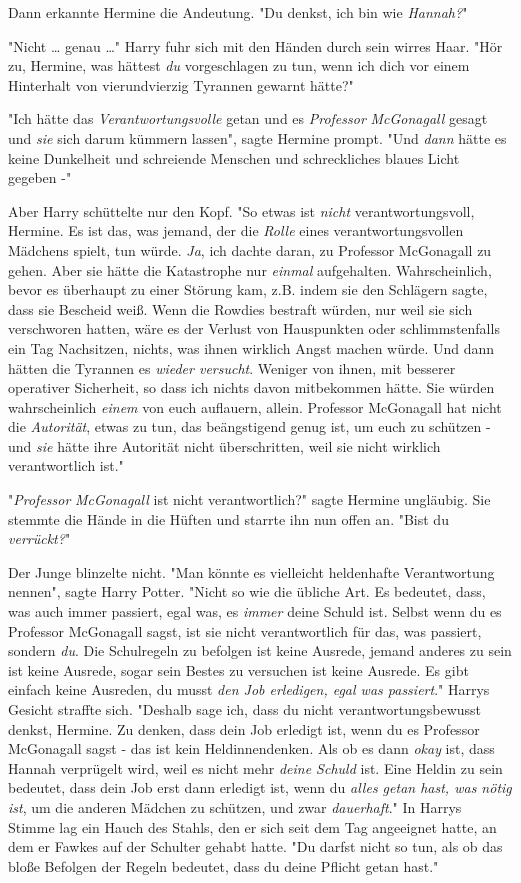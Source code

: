 {Dann erkannte Hermine die Andeutung. "Du denkst, ich bin wie \emph{Hannah?}"

"Nicht … genau …" Harry fuhr sich mit den Händen durch sein wirres Haar. "Hör zu, Hermine, was hättest \emph{du} vorgeschlagen zu tun, wenn ich dich vor einem Hinterhalt von vierundvierzig Tyrannen gewarnt hätte?"

"Ich hätte das \emph{Verantwortungsvolle} getan und es \emph{Professor} \emph{McGonagall} gesagt und \emph{sie} sich darum kümmern lassen", sagte Hermine prompt. "Und \emph{dann} hätte es keine Dunkelheit und schreiende Menschen und schreckliches blaues Licht gegeben -"

Aber Harry schüttelte nur den Kopf. "So etwas ist \emph{nicht} verantwortungsvoll, Hermine. Es ist das, was jemand, der die \emph{Rolle} eines verantwortungsvollen Mädchens spielt, tun würde. \emph{Ja}, ich dachte daran, zu Professor McGonagall zu gehen. Aber sie hätte die Katastrophe nur \emph{einmal} aufgehalten. Wahrscheinlich, bevor es überhaupt zu einer Störung kam, z.B. indem sie den Schlägern sagte, dass sie Bescheid weiß. Wenn die Rowdies bestraft würden, nur weil sie sich verschworen hatten, wäre es der Verlust von Hauspunkten oder schlimmstenfalls ein Tag Nachsitzen, nichts, was ihnen wirklich Angst machen würde. Und dann hätten die Tyrannen es \emph{wieder versucht}. Weniger von ihnen, mit besserer operativer Sicherheit, so dass ich nichts davon mitbekommen hätte. Sie würden wahrscheinlich \emph{einem} von euch auflauern, allein. Professor McGonagall hat nicht die \emph{Autorität}, etwas zu tun, das beängstigend genug ist, um euch zu schützen - und \emph{sie} hätte ihre Autorität nicht überschritten, weil sie nicht wirklich verantwortlich ist."

"\emph{Professor} \emph{McGonagall} ist nicht verantwortlich?" sagte Hermine ungläubig. Sie stemmte die Hände in die Hüften und starrte ihn nun offen an. "Bist du \emph{verrückt?}"

Der Junge blinzelte nicht. "Man könnte es vielleicht heldenhafte Verantwortung nennen", sagte Harry Potter. "Nicht so wie die übliche Art. Es bedeutet, dass, was auch immer passiert, egal was, es \emph{immer} deine Schuld ist. Selbst wenn du es Professor McGonagall sagst, ist sie nicht verantwortlich für das, was passiert, sondern \emph{du}. Die Schulregeln zu befolgen ist keine Ausrede, jemand anderes zu sein ist keine Ausrede, sogar sein Bestes zu versuchen ist keine Ausrede. Es gibt einfach keine Ausreden, du musst \emph{den Job erledigen, egal was passiert}." Harrys Gesicht straffte sich. "Deshalb sage ich, dass du nicht verantwortungsbewusst denkst, Hermine. Zu denken, dass dein Job erledigt ist, wenn du es Professor McGonagall sagst - das ist kein Heldinnendenken. Als ob es dann \emph{okay} ist, dass Hannah verprügelt wird, weil es nicht mehr \emph{deine Schuld} ist. Eine Heldin zu sein bedeutet, dass dein Job erst dann erledigt ist, wenn du \emph{alles getan hast, was nötig ist}, um die anderen Mädchen zu schützen, und zwar \emph{dauerhaft}." In Harrys Stimme lag ein Hauch des Stahls, den er sich seit dem Tag angeeignet hatte, an dem er Fawkes auf der Schulter gehabt hatte. "Du darfst nicht so tun, als ob das bloße Befolgen der Regeln bedeutet, dass du deine Pflicht getan hast."

}
